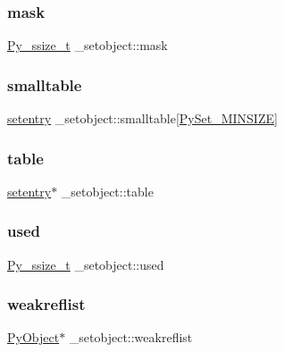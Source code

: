 \subsubsection{\texorpdfstring{mask}{mask}}
{\footnotesize\ttfamily \mbox{\hyperlink{pyport_8h_ac6411a3dfda9ac6feb9e8d859b1184bc}{Py\+\_\+ssize\+\_\+t}} \+\_\+setobject\+::mask}

\mbox{\label{struct__setobject_a7ca49b8b7432c3ef2b23706318114d8e}} 
\subsubsection{\texorpdfstring{smalltable}{smalltable}}
{\footnotesize\ttfamily \mbox{\hyperlink{structsetentry}{setentry}} \+\_\+setobject\+::smalltable\mbox{[}\mbox{\hyperlink{setobject_8h_a4d2d577602a30e417393d879b7eeb70c}{Py\+Set\+\_\+\+M\+I\+N\+S\+I\+ZE}}\mbox{]}}

\mbox{\label{struct__setobject_aff6d958b639059563d402c27e9f545bf}} 
\subsubsection{\texorpdfstring{table}{table}}
{\footnotesize\ttfamily \mbox{\hyperlink{structsetentry}{setentry}}$\ast$ \+\_\+setobject\+::table}

\mbox{\label{struct__setobject_ac25c8ee6dd89cd51f265851a1cf61bc0}} 
\subsubsection{\texorpdfstring{used}{used}}
{\footnotesize\ttfamily \mbox{\hyperlink{pyport_8h_ac6411a3dfda9ac6feb9e8d859b1184bc}{Py\+\_\+ssize\+\_\+t}} \+\_\+setobject\+::used}

\mbox{\label{struct__setobject_a94eb4df0964b2127ac021c6a264bf4a5}} 
\subsubsection{\texorpdfstring{weakreflist}{weakreflist}}
{\footnotesize\ttfamily \mbox{\hyperlink{_python27_2object_8h_aadc84ac7aed2cfa6f20c25f62bf3dac7}{Py\+Object}}$\ast$ \+\_\+setobject\+::weakreflist}



